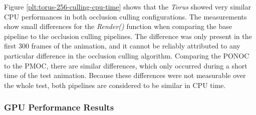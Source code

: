 \noindent
Figure \ref{plt:torus-256-culling-cpu-time} shows that the \emph{Torus} showed very similar \ac{CPU} performances 
in both occlusion culling configurations. The measurements show small differences for the \emph{Render()} function 
when comparing the base pipeline to the occlusion culling pipelines. The difference was only present in the first 300 
frames of the animation, and it cannot be reliably attributed to any particular difference in the occlusion culling 
algorithm. Comparing the \ac{PONOC} to the \ac{PMOC}, there are similar differences, which only occurred during a 
short time of the test animation. Because these differences were not measurable over the whole test, both pipelines 
are considered to be similar in \ac{CPU} time.

\subsubsection*{GPU Performance Results} \label{subsubsec-gpu-performance-results-torus}

